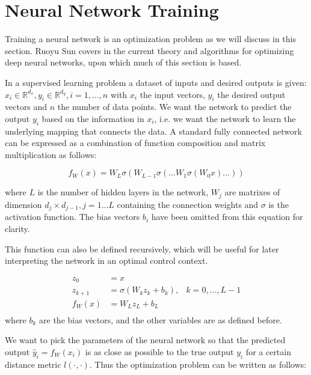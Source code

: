 \newpage

\section{Neural Network Training}
Training a neural network is an optimization problem as we will discuss in this section. Ruoyu Sun covers in \cite{sun2019optimization} the current theory and algorithms for optimizing deep neural networks, upon which much of this section is based.

In a supervised learning problem a dataset of inputs and desired outputs is given: $x_i \in \mathbb{R}^{d_x}, y_i \in \mathbb{R}^{d_y}, i = 1,\dots,n$ with $x_i$ the input vectors, $y_i$ the desired output vectors and $n$ the number of data points. We want the network to predict the output $y_i$ based on the information in $x_i$, i.e. we want the network to learn the underlying mapping that connects the data. A standard fully connected network can be expressed as a combination of function composition and matrix multiplication as follows:


\begin{equation}
         f_W(x) = W_L\sigma(W_{L-1}\sigma(...W_1\sigma(W_0x)...))
\end{equation}

where $L$ is the number of hidden layers in the network, $W_j$ are matrixes of dimension $d_j \times d_{j-1}, j=1 \dots L$ containing the connection weights and $\sigma$ is the activation function. The bias vectors $b_i$ have been omitted from this equation for clarity.

This function can also be defined recursively, which will be useful for later interpreting the network in an optimal control context.

\begin{equation}
	\begin{aligned}
	z_0 &= x \\
	z_{k+1} &= \sigma(W_kz_k + b_k), & k = 0,...,L-1 \\
	f_W(x) &= W_Lz_L + b_L \\
	\end{aligned}
\label{st-eq}
\end{equation}
where $b_k$ are the bias vectors, and the other variables are as defined before.

We want to pick the parameters of the neural network so that the predicted output $\hat{y}_i = f_W(x_i)$ is as close as possible to the true output $y_i$ for a certain distance metric $\mathit{l(\cdot,\cdot)}$. Thus the optimization problem can be written as follows:

